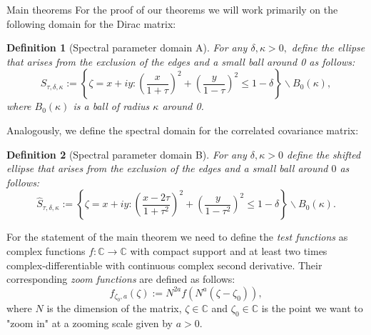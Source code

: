 \documentclass[11pt, a4paper, oneside]{book}
\numberwithin{equation}{chapter}
\newcommand{\beq}{\begin{equation}}
\newcommand{\eeq}{\end{equation}}
\newtheorem{definition}{Definition}[section]
\begin{document}
\begin{section}{Main theorems}
For the proof of our theorems we will work primarily on the following domain for the Dirac matrix:
%
\begin{definition}[Spectral parameter domain A] \label{pardom}
For any $\delta, \kappa>0,$ define the ellipse that arises from the exclusion of the edges and a small ball around 0 as follows:
%
\beq \label{par-domB}
S_{\tau,\delta, \kappa} := \left \{ \zeta=x+iy : \left ( \frac{x}{1+\tau}\right )^2 + \left ( \frac{y}{1-\tau} \right )^2 \leq 1 - \delta \right \}\backslash B_0(\kappa),
\eeq
%
where $B_0(\kappa)$ is a ball of radius $\kappa$ around 0.
\end{definition}
%
Analogously, we define the spectral domain for the correlated covariance matrix:
%
\begin{definition}[Spectral parameter domain B]
    For any $\delta,\kappa >0$ define the shifted ellipse that arises from the exclusion of the edges and a small ball around $0$ as follows:
    \beq \label{par-domA}
    \widehat{S}_{\tau,\delta,\kappa} := \left \{ \zeta=x+iy : \left ( \frac{x - 2\tau}{1+\tau^2}\right )^2 + \left ( \frac{y}{1-\tau^2} \right )^2 \leq 1 - \delta \right \}\backslash B_0(\kappa) .
    \eeq
\end{definition}
%
For the statement of the main theorem we need to define the \textit{test functions} as complex functions $f:\mathbb{C}\to \mathbb{C}$ with compact support and at least two times complex-differentiable with continuous complex second derivative. Their corresponding \textit{zoom functions} are defined as follows:
%
\beq \label{zoomf}
f_{\zeta_0,a}(\zeta) := N^{2a} f(N^a(\zeta - \zeta_0)),
\eeq
%
where $N$ is the dimension of the matrix, $\zeta \in \mathbb{C}$ and $\zeta_0 \in \mathbb{C}$ is the point we want to "zoom in" at a zooming scale given by $a>0$.


\end{section}
\end{document}
